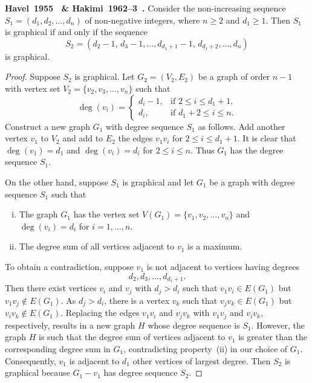 \begin{theorem}
\label{thm:introduction:Havel1955_Hakimi1962:graphical_sequence}
\textbf{Havel~1955~\cite{Havel1955} \&
  Hakimi~1962--3~\cite{Hakimi1962,Hakimi1963}.}
Consider the non-increasing sequence $S_1 = (d_1, d_2, \dots, d_n)$ of
non-negative integers, where $n \geq 2$ and $d_1 \geq 1$. Then $S_1$ is
graphical if and only if the sequence
\[
S_2
=
(d_2 - 1,\, d_3 - 1, \dots, d_{d_1 + 1} - 1,\, d_{d_1 + 2}, \dots, d_n)
\]
is graphical.
\end{theorem}

\begin{proof}
Suppose $S_2$ is graphical. Let $G_2 = (V_2, E_2)$ be a graph of order
$n - 1$ with vertex set $V_2 = \{v_2, v_3, \dots, v_n\}$ such that
\[
\deg(v_i)
=
\begin{cases}
d_i - 1, & \text{if $2 \leq i \leq d_1 + 1$,} \\
d_i,     & \text{if $d_1 + 2 \leq i \leq n$.}
\end{cases}
\]
Construct a new graph $G_1$ with degree sequence $S_1$ as follows. Add
another vertex $v_1$ to $V_2$ and add to $E_2$ the edges $v_1 v_i$ for
$2 \leq i \leq d_1 + 1$. It is clear that $\deg(v_1) = d_1$ and
$\deg(v_i) = d_i$ for $2 \leq i \leq n$. Thus $G_1$ has the degree
sequence $S_1$.

On the other hand, suppose $S_1$ is graphical and let $G_1$ be a graph
with degree sequence $S_1$ such that
%
\begin{enumerate}[(i)]
\item The graph $G_1$ has the vertex set
  $V(G_1) = \{v_1, v_2, \dots, v_n\}$ and $\deg(v_i) = d_i$ for
  $i = 1, \dots, n$.

\item The degree sum of all vertices adjacent to $v_1$ is a maximum.
\end{enumerate}
%
To obtain a contradiction, suppose $v_1$ is not adjacent to vertices
having degrees
\[
d_2, d_3, \dots, d_{d_1 + 1}.
\]
Then there exist vertices $v_i$ and $v_j$ with $d_j > d_i$ such that
$v_1 v_i \in E(G_1)$ but $v_1 v_j \not\in E(G_1)$. As $d_j > d_i$,
there is a vertex $v_k$ such that $v_j v_k \in E(G_1)$ but
$v_i v_k \not\in E(G_1)$. Replacing the edges $v_1 v_i$ and $v_j v_k$
with $v_1 v_j$ and $v_i v_k$, respectively, results in a new graph $H$
whose degree sequence is $S_1$. However, the graph $H$ is such that
the degree sum of vertices adjacent to $v_1$ is greater than the
corresponding degree sum in $G_1$, contradicting property~(ii) in our
choice of $G_1$. Consequently, $v_1$ is adjacent to $d_1$ other
vertices of largest degree. Then $S_2$ is graphical because
$G_1 - v_1$ has degree sequence $S_2$.
\end{proof}

